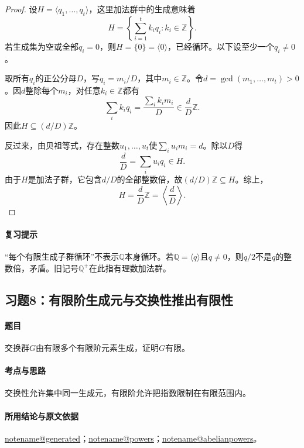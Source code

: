 \documentclass[UTF8,a4paper,11pt,fontset=windows]{ctexart}
\makeatletter
\newcommand{\Z}{\mathbb Z}\newcommand{\Q}{\mathbb Q}
\newcommand{\noteref}[1]{\hyperref[note:#1]{\csname notename@#1\endcsname}}
\newcommand{\exref}[2]{\hyperref[ex:#1:#2]{第#1章习题#2}}
\makeatother
\begin{document}

\begin{proof}
设$H=\langle q_1,\ldots,q_t\rangle$，这里加法群中的生成意味着
\[
H=\left\{\sum_{i=1}^t k_iq_i:k_i\in\Z\right\}.
\]
若生成集为空或全部$q_i=0$，则$H=\{0\}=\langle0\rangle$，已经循环。以下设至少一个$q_i\ne0$。

取所有$q_i$的正公分母$D$，写$q_i=m_i/D$，其中$m_i\in\Z$。令$d=\gcd(m_1,\ldots,m_t)>0$。因$d$整除每个$m_i$，对任意$k_i\in\Z$都有
\[
\sum_i k_iq_i=\frac{\sum_i k_im_i}{D}\in\frac dD\Z.
\]
因此$H\subseteq(d/D)\Z$。

反过来，由贝祖等式，存在整数$u_1,\ldots,u_t$使$\sum_i u_im_i=d$。除以$D$得
\[
\frac dD=\sum_i u_iq_i\in H.
\]
由于$H$是加法子群，它包含$d/D$的全部整数倍，故$(d/D)\Z\subseteq H$。综上，
\[
H=\frac dD\Z=\left\langle\frac dD\right\rangle.
\]
\end{proof}

\paragraph{复习提示}
“每个有限生成子群循环”不表示$\Q$本身循环。若$\Q=\langle q\rangle$且$q\ne0$，则$q/2$不是$q$的整数倍，矛盾。旧记号$\Q^+$在此指有理数加法群。


\subsection{习题8：\texorpdfstring{有限阶生成元与交换性推出有限性}{有限阶生成元与交换性推出有限性}}
\label{ex:2:8}

\paragraph{题目}
交换群$G$由有限多个有限阶元素生成，证明$G$有限。

\paragraph{考点与思路}
交换性允许集中同一生成元，有限阶允许把指数限制在有限范围内。

\paragraph{所用结论与原文依据}
\noteref{generated}；\noteref{powers}；\noteref{abelianpowers}。

\end{document}
